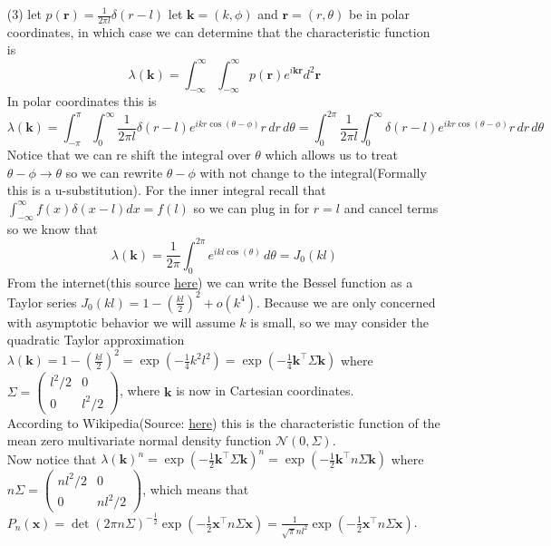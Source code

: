 \documentclass[12pt]{amsart}
\theoremstyle{definition}
\newcommand{\ra}{\rightarrow}
\begin{document}
\begin{itemize}
\item[(3)] let $p(\textbf{r})=\frac{1}{2\pi l}\delta(r-l)$
let $\textbf{k}=(k,\phi)$ and $\textbf{r}=(r,\theta)$ be in polar coordinates, in which case we can determine that the characteristic function is 
$$\lambda(\textbf{k})=\int_{-\infty}^{\infty}\int_{-\infty}^{\infty}p(\textbf{r})e^{i\textbf{k}\textbf{r}}d^2\textbf{r}$$
In polar coordinates this is 
$$\lambda(\textbf{k})=\int_{-\pi}^{\pi}\int_{0}^{\infty}\frac{1}{2\pi l}\delta(r-l)e^{ikr\cos(\theta-\phi)}r\,dr\,d\theta=\int_{0}^{2\pi}\frac{1}{2\pi l}\int_{0}^{\infty}\delta(r-l)e^{ikr\cos(\theta-\phi)}r\,dr\,d\theta$$
Notice that we can re shift the integral over $\theta$ which allows us to treat $\theta-\phi\ra\theta$ so we can rewrite $\theta-\phi$ with not change to the integral(Formally this is a u-substitution). For the inner integral recall that $\int_{-\infty}^{\infty}f(x)\delta(x-l)dx=f(l)$ so we can plug in for $r=l$ and cancel terms so we know that 
$$\lambda(\textbf{k})=\frac{1}{2\pi }\int_{0}^{2\pi}e^{ikl\cos(\theta)}\,d\theta=J_0(kl)$$
From the internet(this source \href{https://encyclopediaofmath.org/wiki/Bessel_functions}{here}) we can write the Bessel function as a Taylor series $J_0(kl)=1-\left(\frac{kl}{2}\right)^2+o(k^4)$.
Because we are only concerned with asymptotic behavior we will assume $k$ is small, so we may consider the quadratic Taylor approximation $\lambda(\textbf{k})=1-\left(\frac{kl}{2}\right)^2=\exp(-\frac{1}{4}k^2l^2)=\exp(-\frac{1}{4}\textbf{k}^\intercal \Sigma \textbf{k})$ where $\Sigma=\begin{pmatrix} l^2/2 & 0\\ 0 & l^2/2 \end{pmatrix}$, where $\textbf{k}$ is now in Cartesian coordinates.\\

According to Wikipedia(Source: \href{https://en.wikipedia.org/wiki/Multivariate_normal_distribution}{here}) this is the characteristic function of the mean zero multivariate normal density function $\mathcal{N}(0, \Sigma)$.\\

Now notice that $\lambda(\textbf{k})^n=\exp(-\frac{1}{2}\textbf{k}^\intercal \Sigma \textbf{k})^n=\exp(-\frac{1}{2}\textbf{k}^\intercal n\Sigma \textbf{k})$ where $n\Sigma=\begin{pmatrix} nl^2/2 & 0\\ 0 & nl^2/2 \end{pmatrix}$, which means that $P_n(\textbf{x})=\det(2\pi n\Sigma)^{-\frac{1}{2}}\exp(-\frac{1}{2}\textbf{x}^\intercal n\Sigma \textbf{x})=\frac{1}{\sqrt{\pi}nl^2}\exp(-\frac{1}{2}\textbf{x}^\intercal n\Sigma \textbf{x})$.\\



\end{itemize}
\end{document}
